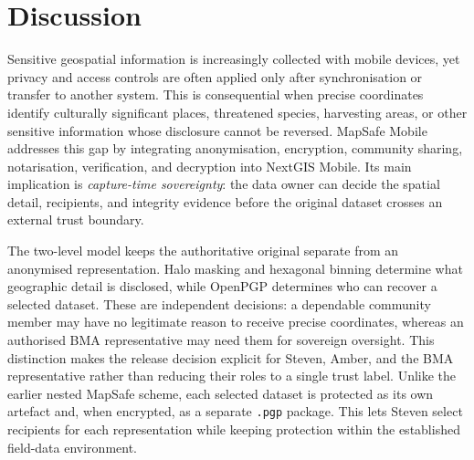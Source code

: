 \documentclass[]{interact}
\begin{document}
%
%

\section{Discussion}
\label{sec:discussion}

Sensitive geospatial information is increasingly collected with mobile devices, yet privacy and access controls are often applied only after synchronisation or transfer to another system. This is consequential when precise coordinates identify culturally significant places, threatened species, harvesting areas, or other sensitive information whose disclosure cannot be reversed. MapSafe Mobile addresses this gap by integrating anonymisation, encryption, community sharing, notarisation, verification, and decryption into NextGIS Mobile. Its main implication is \emph{capture-time sovereignty}: the data owner can decide the spatial detail, recipients, and integrity evidence before the original dataset crosses an external trust boundary.

The two-level model keeps the authoritative original separate from an anonymised representation. Halo masking and hexagonal binning determine what geographic detail is disclosed, while OpenPGP determines who can recover a selected dataset. These are independent decisions: a dependable community member may have no legitimate reason to receive precise coordinates, whereas an authorised BMA representative may need them for sovereign oversight. This distinction makes the release decision explicit for Steven, Amber, and the BMA representative rather than reducing their roles to a single trust label. Unlike the earlier nested MapSafe scheme, each selected dataset is protected as its own artefact and, when encrypted, as a separate \texttt{.pgp} package. This lets Steven select recipients for each representation while keeping protection within the established field-data environment.
\end{document}
